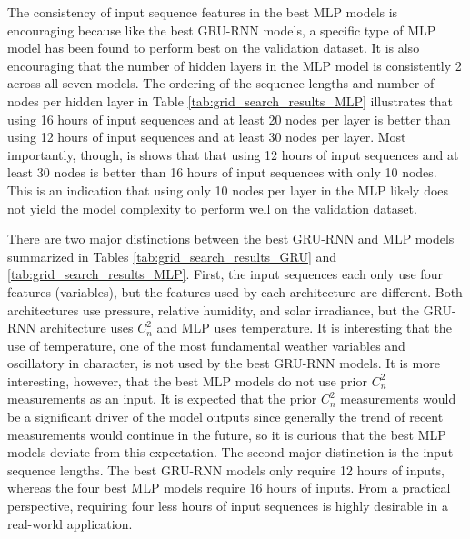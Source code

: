 The consistency of input sequence features in the best \ac{MLP} models is encouraging because like the best \ac{GRU-RNN} models, a specific type of \ac{MLP} model has been found to perform best on the validation dataset. It is also encouraging that the number of hidden layers in the \ac{MLP} model is consistently 2 across all seven models. The ordering of the sequence lengths and number of nodes per hidden layer in Table \ref{tab:grid_search_results_MLP} illustrates that using 16 hours of input sequences and at least 20 nodes per layer is better than using 12 hours of input sequences and at least 30 nodes per layer. Most importantly, though, is shows that that using 12 hours of input sequences and at least 30 nodes is better than 16 hours of input sequences with only 10 nodes. This is an indication that using only 10 nodes per layer in the \ac{MLP} likely does not yield the model complexity to perform well on the validation dataset.

There are two major distinctions between the best \ac{GRU-RNN} and \ac{MLP} models summarized in Tables \ref{tab:grid_search_results_GRU} and \ref{tab:grid_search_results_MLP}. First, the input sequences each only use four features (variables), but the features used by each architecture are different. Both architectures use pressure, relative humidity, and solar irradiance, but the \ac{GRU-RNN} architecture uses $C_{n}^{2}$ and \ac{MLP} uses temperature. It is interesting that the use of temperature, one of the most fundamental weather variables and oscillatory in character, is not used by the best \ac{GRU-RNN} models. It is more interesting, however, that the best \ac{MLP} models do not use prior $C_{n}^{2}$ measurements as an input. It is expected that the prior $C_{n}^{2}$ measurements would be a significant driver of the model outputs since generally the trend of recent measurements would continue in the future, so it is curious that the best \ac{MLP} models deviate from this expectation. The second major distinction is the input sequence lengths. The best \ac{GRU-RNN} models only require 12 hours of inputs, whereas the four best \ac{MLP} models require 16 hours of inputs. From a practical perspective, requiring four less hours of input sequences is highly desirable in a real-world application.

